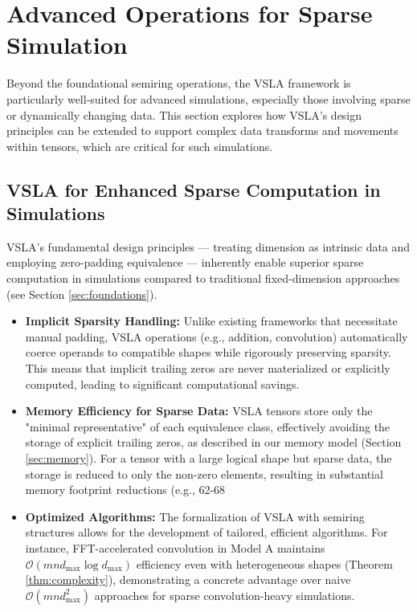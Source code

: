 \documentclass[11pt]{article}
\begin{document}
\section{Advanced Operations for Sparse Simulation}
\label{sec:advanced_ops}

Beyond the foundational semiring operations, the VSLA framework is particularly well-suited for advanced simulations, especially those involving sparse or dynamically changing data. This section explores how VSLA's design principles can be extended to support complex data transforms and movements within tensors, which are critical for such simulations.

\subsection{VSLA for Enhanced Sparse Computation in Simulations}

VSLA's fundamental design principles — treating dimension as intrinsic data and employing zero-padding equivalence — inherently enable superior sparse computation in simulations compared to traditional fixed-dimension approaches (see Section \ref{sec:foundations}).

\begin{itemize}
    \item \textbf{Implicit Sparsity Handling:} Unlike existing frameworks that necessitate manual padding, VSLA operations (e.g., addition, convolution) automatically coerce operands to compatible shapes while rigorously preserving sparsity. This means that implicit trailing zeros are never materialized or explicitly computed, leading to significant computational savings.
    \item \textbf{Memory Efficiency for Sparse Data:} VSLA tensors store only the "minimal representative" of each equivalence class, effectively avoiding the storage of explicit trailing zeros, as described in our memory model (Section \ref{sec:memory}). For a tensor with a large logical shape but sparse data, the storage is reduced to only the non-zero elements, resulting in substantial memory footprint reductions (e.g., 62-68%
    \item \textbf{Optimized Algorithms:} The formalization of VSLA with semiring structures allows for the development of tailored, efficient algorithms. For instance, FFT-accelerated convolution in Model A maintains $\mathcal{O}(mnd_{\max}\log d_{\max})$ efficiency even with heterogeneous shapes (Theorem \ref{thm:complexity}), demonstrating a concrete advantage over naive $\mathcal{O}(mnd_{\max}^{2})$ approaches for sparse convolution-heavy simulations.
\end{itemize}
\end{document}
